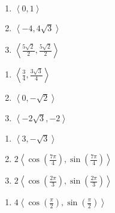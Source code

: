 \begin{multicols}{3}
\begin{enumerate}		\setcounter{enumi}{\value{Review}}
    \item $\left\langle 0, 1\right\rangle$
    \item $\left\langle -4, 4\sqrt{3}\right\rangle$
    \item $\left\langle \frac{5\sqrt{2}}{2}, \frac{5\sqrt{2}}{2} \right\rangle$
\end{enumerate}	\setcounter{Review}{\value{enumi}}
\end{multicols}
\begin{multicols}{3}
\begin{enumerate}		\setcounter{enumi}{\value{Review}}
    \item $\left\langle \frac{3}{4}, \frac{3\sqrt{3}}{4}\right\rangle$
    \item $\left\langle 0, -\sqrt{2} \right\rangle$
    \item $\left\langle -2\sqrt{3}, -2 \right\rangle$
\end{enumerate}	\setcounter{Review}{\value{enumi}}
\end{multicols}
\begin{multicols}{3}
\begin{enumerate}		\setcounter{enumi}{\value{Review}}
    \item $\left\langle 3, -\sqrt{3} \right\rangle$
    \item $2\left\langle \cos\left(\frac{7\pi}{4}\right), \sin\left(\frac{7\pi}{4}\right) \right\rangle$
    \item $2\left\langle \cos\left(\frac{2\pi}{3}\right), \sin\left(\frac{2\pi}{3}\right) \right\rangle$
\end{enumerate}	\setcounter{Review}{\value{enumi}}
\end{multicols}
\begin{multicols}{3}
\begin{enumerate}		\setcounter{enumi}{\value{Review}}
    \item $4\left\langle \cos\left(\frac{\pi}{2}\right), \sin\left(\frac{\pi}{2}\right) \right\rangle$
\end{enumerate}
\end{multicols}